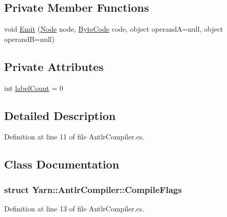 \subsection*{Private Member Functions}
\begin{DoxyCompactItemize}
\item 
void \hyperlink{a00038_a3204aa5b87eaee776b32742df1ee28f9}{Emit} (\hyperlink{a00051_a00379}{Node} node, \hyperlink{a00051_ad5dfb6ee68ca7469623ad3e459f98894}{Byte\-Code} code, object operand\-A=null, object operand\-B=null)
\end{DoxyCompactItemize}
\subsection*{Private Attributes}
\begin{DoxyCompactItemize}
\item 
int \hyperlink{a00038_acf45ec9d1c6301f1798b2722f6e14ddf}{label\-Count} = 0
\end{DoxyCompactItemize}


\subsection{Detailed Description}


Definition at line 11 of file Antlr\-Compiler.\-cs.



\subsection{Class Documentation}
\label{a00374}
\hypertarget{a00038_a00374}{}
\subsubsection{struct Yarn\-:\-:Antlr\-Compiler\-:\-:Compile\-Flags}


Definition at line 13 of file Antlr\-Compiler.\-cs.




